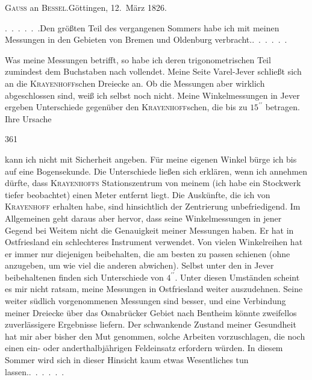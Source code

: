 \begin{center}
\textsc{Gauss} an \textsc{Bessel}.\quad Göttingen, 12.~März 1826.
\end{center}

\par\noindent\hspace*{\parindent}.\ .\ .\ .\ .\ .\quad Den größten Teil des vergangenen Sommers habe ich mit meinen Messungen in den Gebieten von Bremen und Oldenburg verbracht.\quad.\ .\ .\ .\ .\ .

\par\noindent\hspace*{\parindent}Was meine Messungen betrifft, so habe ich deren trigonometrischen Teil zumindest dem Buchstaben nach vollendet. Meine Seite Varel-Jever schließt sich an die \textsc{Krayenhoff}schen Dreiecke an.
Ob die Messungen aber wirklich abgeschlossen sind, weiß ich selbst noch nicht.
Meine Winkelmessungen in Jever ergeben  Unterschiede gegenüber den \textsc{Krayenhoff}schen, die bis zu \(15^{\prime\prime}\) betragen.
Ihre Ursache
\par\clearpage
{}\hfill361\par\medskip
\noindent kann ich nicht mit Sicherheit angeben.
Für meine eigenen Winkel bürge ich bis auf eine Bogensekunde.
Die Unterschiede ließen sich erklären, wenn ich annehmen dürfte, dass \textsc{Krayenhoffs} Stationszentrum von meinem (ich habe ein Stockwerk tiefer beobachtet) einen Meter entfernt liegt.
Die Auskünfte, die ich von \textsc{Krayenhoff} erhalten habe, sind hinsichtlich der Zentrierung unbefriedigend. Im Allgemeinen geht daraus aber hervor, dass seine Winkelmessungen in jener Gegend bei Weitem nicht die Genauigkeit meiner Messungen haben.
Er hat in Ostfriesland ein schlechteres Instrument verwendet. Von vielen Winkelreihen hat er immer nur diejenigen beibehalten, die am besten zu passen schienen (ohne anzugeben, um wie viel die anderen abwichen). Selbst unter den in Jever beibehaltenen finden sich Unterschiede von \(4^{\prime\prime}\).
Unter diesen Umständen scheint es mir nicht ratsam, meine Messungen in Ostfriesland weiter auszudehnen.
Seine weiter südlich vorgenommenen Messungen sind besser, und eine Verbindung meiner Dreiecke über das Osnabrücker Gebiet nach Bentheim könnte zweifellos zuverlässigere Ergebnisse liefern.
Der schwankende Zustand meiner Gesundheit hat mir aber bisher den Mut genommen, solche Arbeiten vorzuschlagen, die noch einen ein- oder anderthalbjährigen Feldeinsatz erfordern würden. In diesem Sommer wird sich in dieser Hinsicht kaum etwas Wesentliches tun lassen.\quad.\ .\ .\ .\ .\ .

